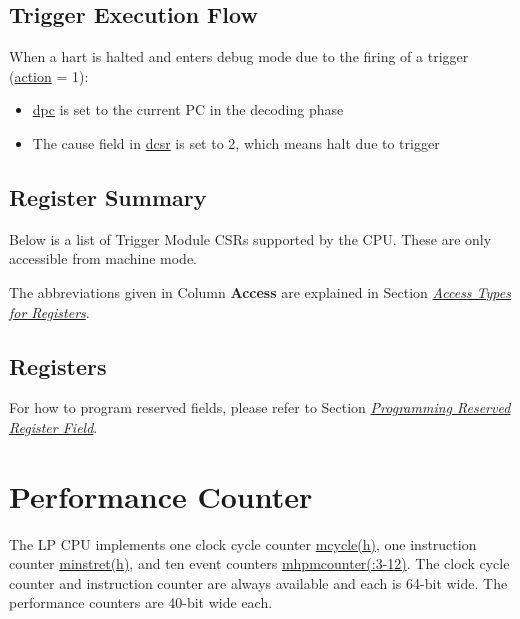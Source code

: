 \documentclass[main\_\_EN.tex]{subfiles}
\begin{document}
\subsection{Trigger Execution Flow}
\label{sec:ulp-hwt-suggest-op}

When a hart is halted and enters debug mode due to the firing of a trigger (\hyperref[fielddesc:LPMCONTROLACTION]{action} = 1):
\begin{itemize}
    \item \hyperref[regdesc:LPDPC]{dpc} is set to the current PC in the decoding phase
    \item The cause field in \hyperref[regdesc:LPDCSR]{dcsr} is set to 2, which means halt due to trigger
\end{itemize}


\subsection{Register Summary}\label{sec:ulp-hwt-reg-sum}
Below is a list of Trigger Module CSRs supported by the CPU. These are only accessible from machine mode.

The abbreviations given in Column \textbf{Access} are explained in Section \hyperref[glossary-access-types]{\textit{Access Types for Registers}}.



\subsection{Registers}

For how to program reserved fields, please refer to Section \hyperref[programming-reserved-field]{\textit{Programming Reserved Register Field}}.




\section{Performance Counter}

The LP CPU implements one clock cycle counter \hyperref[regdesc:LPMCYCLEH]{mcycle(h)}, one instruction counter \hyperref[regdesc:LPMINSTRETH]{minstret(h)}, and ten event counters \hyperref[regdesc:LPMHPMCOUNTER]{mhpmcounter(:3-12)}. The clock cycle counter and instruction counter are always available and each is 64-bit wide. The performance counters are 40-bit wide each.
\end{document}
